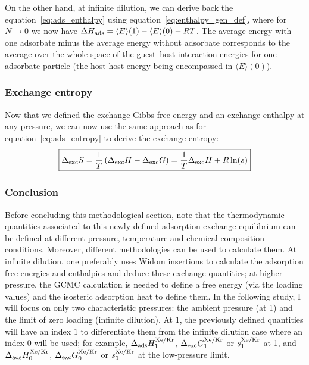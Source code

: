 \documentclass[main.tex]{subfiles}
\begin{document}
On the other hand, at infinite dilution, we can derive back the equation~\ref{eq:ads_enthalpy} using equation~\ref{eq:enthalpy_gen_def}, where for $N\rightarrow0$ we now have $\Delta H_{\text{ads}} = \langle E \rangle(1)-\langle E \rangle(0) - RT$. The average energy with one adsorbate minus the average energy without adsorbate corresponds to the average over the whole space of the guest--host interaction energies for one adsorbate particle (the host-host energy being encompassed in $\langle E \rangle(0)$).

\subsubsection{Exchange entropy}

Now that we defined the exchange Gibbs free energy and an exchange enthalpy at any pressure, we can now use the same approach as for equation~\ref{eq:ads_entropy} to derive the exchange entropy:
\begin{equation}\label{eq:exc_entropy}
  \boxed{
  \Delta_{\text{exc}}S = \dfrac{1}{T}\left(\Delta_{\text{exc}}H - \Delta_{\text{exc}}G\right)= \dfrac{1}{T}\Delta_{\text{exc}}H + R\ln(s)
  }
\end{equation}

\subsubsection{Conclusion}

Before concluding this methodological section, note that the thermodynamic quantities associated to this newly defined adsorption exchange equilibrium can be defined at different pressure, temperature and chemical composition conditions. Moreover, different methodologies can be used to calculate them. At infinite dilution, one preferably uses Widom insertions to calculate the adsorption free energies and enthalpies and deduce these exchange quantities; at higher pressure, the GCMC calculation is needed to define a free energy (via the loading values) and the isosteric adsorption heat to define them. In the following study, I will focus on only two characteristic pressures: the ambient pressure (at \SI{1}{\atm}) and the limit of zero loading (infinite dilution). At \SI{1}{\atm}, the previously defined quantities will have an index $1$ to differentiate them from the infinite dilution case where an index $0$ will be used; for example, $\Delta_{\text{ads}}H_{\text{1}}^{\text{Xe/Kr}}$, $\Delta_{\text{exc}}G_{\text{1}}^{\text{Xe/Kr}}$ or $s_{\text{1}}^{\text{Xe/Kr}}$ at \SI{1}{\atm}, and $\Delta_{\text{ads}}H_{\text{0}}^{\text{Xe/Kr}}$, $\Delta_{\text{exc}}G_{\text{0}}^{\text{Xe/Kr}}$ or $s_{\text{0}}^{\text{Xe/Kr}}$ at the low-pressure limit. 
\end{document}

